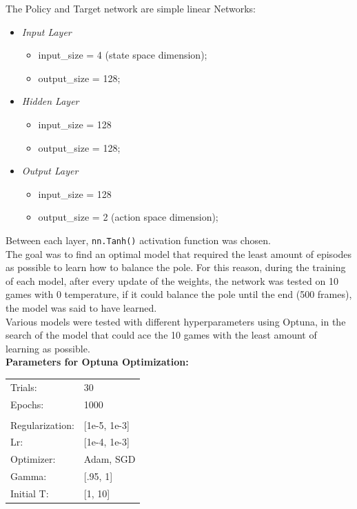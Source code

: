 \documentclass[11pt,a4paper,twocolumn]{IEEEtran}
\newcommand{\thinsepline}{\noindent\makebox[\linewidth]{\rule{7.5cm}{0.02pt}}}
\begin{document}
		The Policy and Target network are simple linear Networks:
		\begin{itemize}
			\item \textit{Input Layer}
			\begin{itemize}
				\item input\_size = 4 (state space dimension);
				\item output\_size = 128;
			\end{itemize}
			\item \textit{Hidden Layer}
			\begin{itemize}
				\item input\_size = 128
				\item output\_size = 128;
			\end{itemize}
			\item \textit{Output Layer}
			\begin{itemize}
				\item input\_size = 128
				\item output\_size = 2 (action space dimension);
			\end{itemize}
		\end{itemize}
		Between each layer, \texttt{nn.Tanh()} activation function was chosen.\medskip\\
		The goal was to find an optimal model that required the least amount of episodes as possible to learn how to balance the pole. For this reason, during the training of each model, after every update of the weights, the network was tested on 10 games with 0 temperature, if it could balance the pole until the end (500 frames), the model was said
		to have learned.\\
		Various models were tested with different hyperparameters using Optuna, in the search of the model that could ace the 10 games with the least amount of learning as possible.
		\thinsepline\\
		\textbf{Parameters for Optuna Optimization:}\medskip\\
		\begin{tabular}{ll}
			Trials: & 30 \\
			Epochs: & 1000 \\
			\hline\vspace*{-.4cm}\\
			Regularization: & [1e-5, 1e-3] \\
			Lr: & [1e-4, 1e-3] \\
			Optimizer: & Adam, SGD\\
			Gamma: & [.95, 1]\\
			Initial T:& [1, 10]\\
		\end{tabular}\\
		\thinsepline\\
		\newpage
\end{document}

